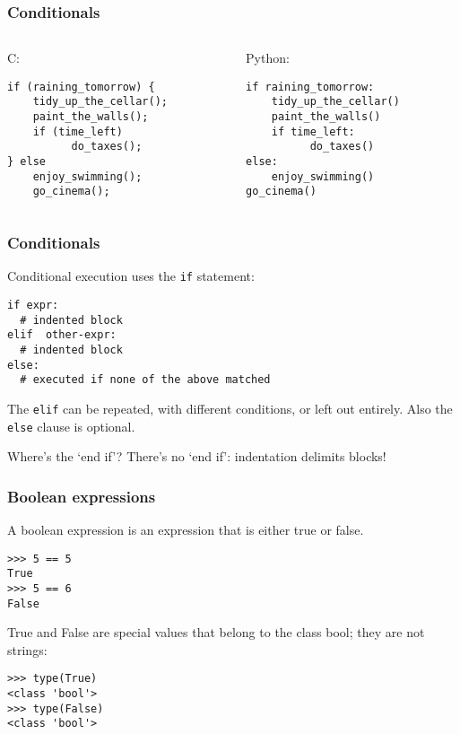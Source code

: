 \begin{frame}[fragile]\frametitle{Conditionals}
  \begin{columns}[c]
    \begin{column}{0.5\linewidth}
    C:
\begin{lstlisting}
if (raining_tomorrow) {
    tidy_up_the_cellar(); 
    paint_the_walls();
    if (time_left) 
          do_taxes();
} else
    enjoy_swimming();
    go_cinema();
\end{lstlisting}
      \end{column}
    \begin{column}{0.5\linewidth}
    Python:
    \begin{lstlisting}
if raining_tomorrow:
    tidy_up_the_cellar() 
    paint_the_walls()
    if time_left: 
          do_taxes()
else:
    enjoy_swimming()
go_cinema()
\end{lstlisting}
        \end{column}
  \end{columns}
\end{frame}

\begin{frame}[fragile]\frametitle{Conditionals}
  Conditional execution uses the \texttt{if} statement:
\begin{lstlisting}
if expr:
  # indented block
elif  other-expr:
  # indented block
else:
  # executed if none of the above matched
\end{lstlisting}

The \texttt{elif} can be repeated, with different conditions, or left out entirely.
Also the \texttt{else} clause is optional.
 

Where's the `end if'?
There's no `end if': indentation delimits blocks!

\end{frame}

\begin{frame}[fragile]\frametitle{Boolean expressions}
A boolean expression is an expression that is either true or false.
\begin{lstlisting}
>>> 5 == 5
True
>>> 5 == 6
False
\end{lstlisting}
True and False are special values that belong to the class bool; they are not
strings:
\begin{lstlisting}
>>> type(True)
<class 'bool'>
>>> type(False)
<class 'bool'>
\end{lstlisting}
\end{frame}

